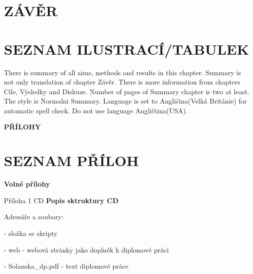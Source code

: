 \documentclass{thesisKGI}
\begin{document}
    \newpage
    \section{ZÁVĚR}

    \newpage
    

    \newpage
    \section*{SEZNAM ILUSTRACÍ/TABULEK}

    \begin{summary}
      There is summary of all aims, methods and results in this chapter.
      Summary is not only translation of chapter Závěr. There is more
      information from chapters Cíle, Výsledky and Diskuze. Number of
      pages of Summary chapter is two at least. The style is Normalni
      Summary. Language is set to Angličina(Velká Británie) for automatic
      spell check. Do not use language Angličtina(USA). 
    \end{summary}

    \newpage
    \vspace*{180pt}
    \begin{center}
      {\Large\textbf{PŘÍLOHY}}
    \end{center}
    \vspace*{\fill}

    \newpage
    \section*{SEZNAM PŘÍLOH}
    \textbf{Volné přílohy}

    Příloha 1 CD \newline
    \newline
    \textbf{Popis sktruktury CD}

      Adresáře a soubory:

        - složka se skripty

        - web - webová stránky jako doplněk k diplomové práci

        - Solanska\_dp.pdf - text diplomové práce

    \vspace*{\fill}

  
\end{document}
